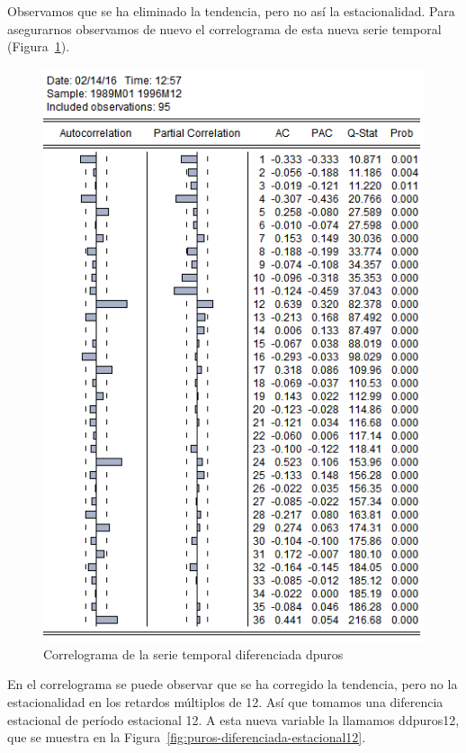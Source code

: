 \documentclass[12pt,a4paper,twoside,openright,titlepage,final]{article}
\begin{document}
Observamos que se ha eliminado la tendencia, pero no así la estacionalidad. Para asegurarnos observamos de nuevo el correlograma de esta nueva serie temporal (Figura~\ref{fig:correlograma-puros-diferenciada}).\\


\begin{figure}[tbph!]
	\centering
	\includegraphics[width=0.8\linewidth]{imagenes/puros/correlograma-puros-diferenciada.png}
	\caption{Correlograma de la serie temporal diferenciada dpuros}
	\label{fig:correlograma-puros-diferenciada}
\end{figure}

En el correlograma se puede observar que se ha corregido la tendencia, pero no la estacionalidad en los retardos múltiplos de 12. Así que tomamos una diferencia estacional de período estacional 12. A esta nueva variable la llamamos ddpuros12, que se muestra en la Figura~\ref{fig:puros-diferenciada-estacional12}.\\
\end{document}
